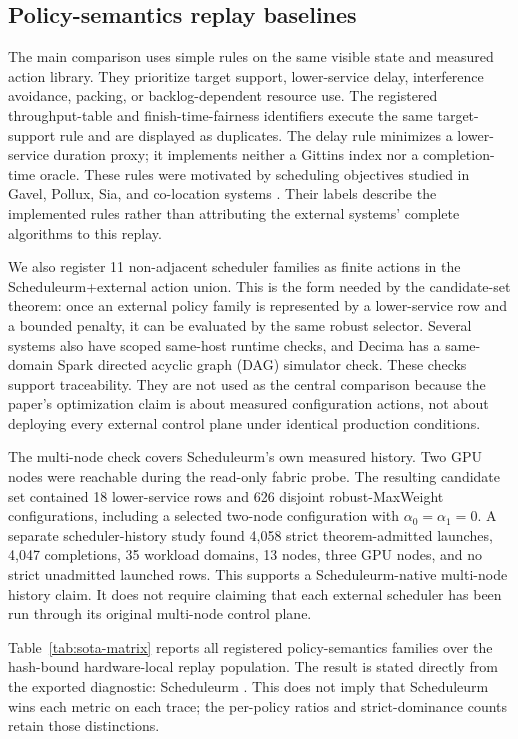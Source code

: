 \documentclass[opre,dblanonrev]{informs4}
\begin{document}
\subsection{Policy-semantics replay baselines}
\label{subsec:policy-semantics-baselines}

The main comparison uses simple rules on the same visible state and measured
action library.  They prioritize target support, lower-service delay,
interference avoidance, packing, or backlog-dependent resource use.  The
registered throughput-table and finish-time-fairness identifiers execute the
same target-support rule and are displayed as duplicates.  The delay rule
minimizes a lower-service duration proxy; it implements neither a Gittins index
nor a completion-time oracle.  These rules were motivated by scheduling
objectives studied in Gavel, Pollux, Sia, and co-location systems
\citep{narayanan2020gavel,qiao2021pollux,sia2023,xiao2018gandiva,yu2020salus,iadeep2023}.
Their labels describe the implemented rules rather than attributing the
external systems' complete algorithms to this replay.

We also register 11 non-adjacent scheduler families as finite actions in the
Scheduleurm+external action union.  This is the form needed by the
candidate-set theorem: once an external policy family is represented by a
lower-service row and a bounded penalty, it can be evaluated by the same robust
selector.  Several systems also have scoped same-host runtime checks, and
Decima has a same-domain Spark directed acyclic graph (DAG) simulator check.
These checks support traceability.  They are not used as the central comparison
because the paper's optimization claim is about measured configuration actions,
not about deploying every external control plane under identical production
conditions.

The multi-node check covers Scheduleurm's own measured history.  Two GPU nodes
were reachable during the read-only fabric probe.  The resulting candidate set
contained 18 lower-service rows and 626 disjoint robust-MaxWeight
configurations, including a selected two-node configuration with
\(\alpha_0=\alpha_1=0\).  A separate scheduler-history study found 4,058
strict theorem-admitted launches, 4,047 completions, 35 workload domains, 13
nodes, three GPU nodes, and no strict unadmitted launched rows.  This supports a
Scheduleurm-native multi-node history claim.  It does not require claiming that
each external scheduler has been run through its original multi-node control
plane.

Table~\ref{tab:sota-matrix} reports all \UnifiedSotaPolicyCount{} registered
policy-semantics families over the hash-bound hardware-local replay population.
The result is stated directly from the exported diagnostic:
Scheduleurm \UnifiedSotaConclusion.  This does not imply that Scheduleurm wins
each metric on each trace; the per-policy ratios and strict-dominance counts
retain those distinctions.
\end{document}
